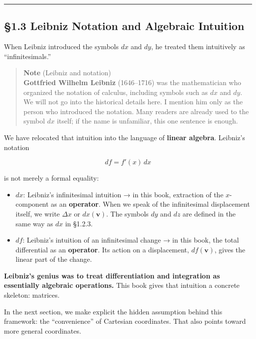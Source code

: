 \begin{center}\rule{0.5\linewidth}{0.5pt}\end{center}

\hypertarget{leibniz-notation-and-algebraic-intuition}{%
\subsection{§1.3 Leibniz Notation and Algebraic
Intuition}\label{leibniz-notation-and-algebraic-intuition}}

When Leibniz introduced the symbols \(dx\) and \(dy\), he treated them
intuitively as ``infinitesimals.''

\begin{quote}
\textbf{Note} (Leibniz and notation)\\
\textbf{Gottfried Wilhelm Leibniz} (1646--1716) was the mathematician
who organized the notation of calculus, including symbols such as \(dx\)
and \(dy\). We will not go into the historical details here. I mention
him only as the person who introduced the notation. Many readers are
already used to the symbol \(dx\) itself; if the name is unfamiliar,
this one sentence is enough.
\end{quote}

We have relocated that intuition into the language of
\textbf{linear algebra}. Leibniz's notation

\[
df=f'(x)\,dx
\]

is not merely a formal equality:

\begin{itemize}
\item
  \(dx\): Leibniz's infinitesimal intuition → in this book, extraction
  of the \(x\)-component as an \textbf{operator}. When we speak of the
  infinitesimal displacement itself, we write \(\Delta x\) or
  \(dx(\mathbf{v})\). The symbols \(dy\) and \(dz\) are defined in the
  same way as \(dx\) in §1.2.3.
\item
  \(df\): Leibniz's intuition of an infinitesimal change → in this book,
  the total differential as an \textbf{operator}. Its action on a
  displacement, \(df(\mathbf{v})\), gives the linear part of the change.
\end{itemize}

\textbf{Leibniz’s genius was to treat differentiation and integration as essentially algebraic operations.}
This book gives that intuition a concrete skeleton: matrices.

In the next section, we make explicit the hidden assumption behind this
framework: the ``convenience'' of Cartesian coordinates. That also
points toward more general coordinates.

